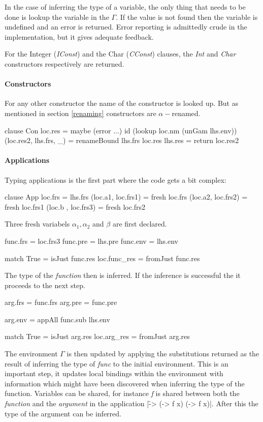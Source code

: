 In the case of inferring the type of a variable, the only thing that needs to be done is lookup the variable in the $\Gamma$. If the value is not found then the variable is undefined and an error is returned. Error reporting is admittedly crude in the implementation, but it gives adequate feedback.

For the Integer (\emph{IConst}) and the Char (\emph{CConst}) clauses, the \emph{Int} and \emph{Char} constructors respectively are returned.

\paragraph{Constructors}
For any other constructor the name of the constructor is looked up. But as mentioned in section \ref{renaming} constructors are $\alpha-$renamed.

\begin{code}
clause Con
   loc.res = maybe (error ...) id (lookup loc.nm (unGam lhs.env))
   (loc.res2, lhs.frs, _) = renameBound lhs.frs loc.res
   lhs.res = return loc.res2
\end{code}

\paragraph{Applications}
Typing applications is the first part where the code gets a bit complex:

\begin{code}
clause App
   loc.frs              = lhs.frs
   (loc.a1,  loc.frs1)  = fresh loc.frs
   (loc.a2,  loc.frs2)  = fresh loc.frs1
   (loc.b ,  loc.frs3)  = fresh loc.frs2
\end{code}
Three fresh variabels $\alpha_1, \alpha_2$ and $\beta$ are first declared.

\begin{code}
func.frs = loc.frs3
func.pre = lhs.pre
func.env = lhs.env
    
match True    = isJust func.res       
loc.func_res  = fromJust func.res
\end{code}
The type of the \emph{function} then is inferred. If the inference is successful the it proceeds to the next step.

\begin{code}       
arg.frs = func.frs
arg.pre = func.pre
    
arg.env = appAll func.sub lhs.env
 
match True   = isJust arg.res   
loc.arg_res  = fromJust arg.res
\end{code}
The environment $\Gamma$ is then updated by applying the substitutions returned as the result of inferring the type of \emph{func} to the initial environment. This is an important step, it updates local bindings within the environment with information which might have been discovered when inferring the type of the function. Variables can be shared, for instance \emph{f} is shared between both the \emph{function} and the \emph{argument} in the application |\f -> (\x -> f x) (\x -> f x)|. After this the type of the argument can be inferred.
       
